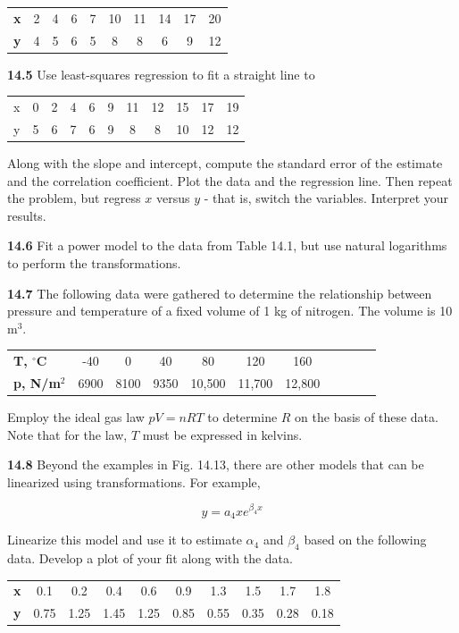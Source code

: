 \documentclass[../main.tex]{subfiles}
\begin{document}
\begin{multicols}{2}
	\noindent \begin{tabular}{c c c c c c c c c c }
	 	\textbf{x} & 2 & 4 & 6 & 7 & 10 & 11 & 		14 & 		17 & 		20 \\
	  	\textbf{y} & 4 & 5 & 6 & 5 & 8 & 8 & 6 & 9 & 		12
	\end{tabular}

	\noindent\textbf{14.5} Use least-squares regression to fit a straight line to

	\noindent \begin{tabular}{c c c c c c c c c c c  }
 		x & 0 & 2 & 4 & 6 & 9 & 11 & 12 & 15 & 17 & 19 \\
 		y & 5 & 6 & 7 & 6 & 9 & 8 & 8 & 10 & 12 & 12
   	\end{tabular}

   	\noindent Along with the slope and intercept, compute the standard
	   error of the estimate and the correlation coefficient. Plot the
	   data and the regression line. Then repeat the problem, but
	   regress $x$ versus $y$ - that is, switch the variables. Interpret
	   your results.

	\noindent\textbf{14.6} Fit a power model to the data from Table 14.1, but use
	natural logarithms to perform the transformations.

	\noindent\textbf{14.7} The following data were gathered to determine the
	relationship between pressure and temperature of a fixed
	volume of 1 kg of nitrogen. The volume is 10 m$^3$.

	\noindent \begin{tabular}{l c c c c c c c c c c  }
		\textbf{T, $^\circ$C} & -40 & 0 & 40 & 80 & 120 & 160 \\
		\textbf{p, N/m$^2$} & 6900 & 8100 & 9350 & 10,500 & 11,700 & 12,800
  	\end{tabular}

	\noindent Employ the ideal gas law $pV = nRT$ to determine $R$ on the
	basis of these data. Note that for the law, $T$ must be expressed
	in kelvins.

	\noindent\textbf{14.8} Beyond the examples in Fig. 14.13, there are other
	models that can be linearized using transformations. For
	example,

	$$y = a_4 x e^{\beta_4 x}$$

	\noindent Linearize this model and use it to estimate $\alpha_4$ and $\beta_4$ based
	on the following data. Develop a plot of your fit along with
	the data.

	\noindent \begin{tabular}{c c c c c c c c c c}
		\textbf{x} & 0.1 & 0.2 & 0.4 & 0.6 & 0.9 & 1.3 & 1.5 & 1.7 & 1.8 \\
		\textbf{y} & 0.75 & 1.25 & 1.45 & 1.25 & 0.85 & 0.55 & 0.35 & 0.28 & 0.18	
  	\end{tabular}


\end{multicols}
\end{document}

